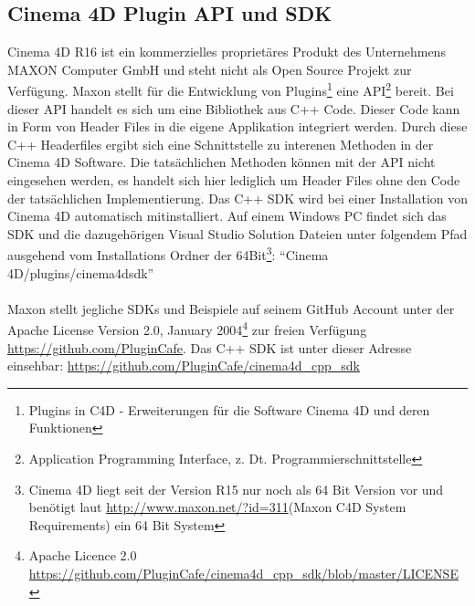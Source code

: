\documentclass[pagesize, paper=a4, fontsize=12pt,titlepage=true, headings=small, headnosepline, abstractoff, liststotoc, nochapterprefix, plainheadsepline, twoside]{scrreprt}
\begin{document}
\subsection{Cinema 4D Plugin API und SDK}
Cinema 4D R16 \autocite{MaxonC4d2014} ist ein kommerzielles proprietäres Produkt des Unternehmens MAXON Computer GmbH und steht nicht als Open Source Projekt zur Verfügung. Maxon stellt für die Entwicklung von Plugins\footnote{Plugins in C4D - Erweiterungen für die Software Cinema 4D und deren Funktionen} eine API\footnote{Application Programming Interface, z. Dt. Programmierschnittstelle} bereit. Bei dieser API handelt es sich um eine Bibliothek aus C++ Code. Dieser Code kann in Form von Header Files in die eigene Applikation integriert werden. Durch diese C++ Headerfiles ergibt sich eine Schnittstelle zu interenen Methoden in der Cinema 4D Software. Die tatsächlichen Methoden können mit der API nicht eingesehen werden, es handelt sich hier lediglich um Header Files ohne den Code der tatsächlichen Implementierung. Das C++ SDK wird bei einer Installation von Cinema 4D automatisch mitinstalliert. Auf einem Windows PC findet sich das SDK und die dazugehörigen Visual Studio Solution Dateien unter folgendem Pfad ausgehend vom Installations Ordner der 64Bit\footnote{Cinema 4D liegt seit der Version R15 nur noch als 64 Bit Version vor und benötigt laut \url{http://www.maxon.net/?id=311}(Maxon C4D System Requirements) ein 64 Bit System}: {“Cinema 4D/plugins/cinema4dsdk”}
\\
\\
Maxon stellt jegliche SDKs und Beispiele auf seinem GitHub Account unter der Apache License Version 2.0, January 2004\footnote{Apache Licence 2.0 \url{https://github.com/PluginCafe/cinema4d_cpp_sdk/blob/master/LICENSE}} zur freien Verfügung \url{https://github.com/PluginCafe}. Das C++ SDK ist unter dieser Adresse einsehbar: \url{https://github.com/PluginCafe/cinema4d_cpp_sdk}
\end{document}
